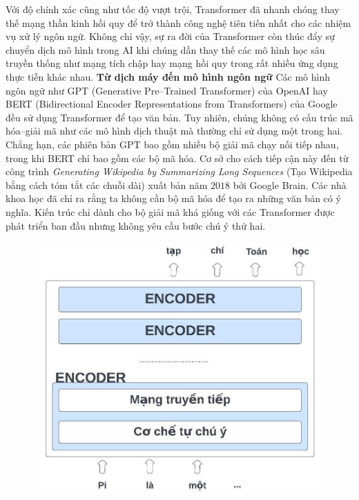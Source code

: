 \begin{multicols}{2}
	\vskip 0.1cm
	Với độ chính xác cũng như tốc độ vượt trội, Transformer đã nhanh chóng thay thế mạng thần kinh hồi quy để trở thành công nghệ tiên tiến nhất cho các nhiệm vụ xử lý ngôn ngữ. Không chỉ vậy, sự ra đời của Transformer còn thúc đẩy sự chuyển dịch mô hình trong AI khi chúng dần thay thế các mô hình học sâu truyền thống như mạng tích chập hay mạng hồi quy trong rất nhiều ứng dụng thực tiễn khác nhau.
	\vskip 0.1cm
	\textbf{\color{timhieukhoahoc}Từ dịch máy đến mô hình ngôn ngữ}
	\vskip 0.1cm
	Các mô hình ngôn ngữ như GPT (Generative Pre--Trained Transformer) của OpenAI hay BERT (Bidirectional Encoder Representations from Transformers) của Google đều sử dụng Transformer để tạo văn bản. Tuy nhiên, chúng không có cấu trúc mã hóa--giải mã như các mô hình dịch thuật mà thường chỉ sử dụng một trong hai. Chẳng hạn, các phiên bản GPT bao gồm nhiều bộ giải mã chạy nối tiếp nhau, trong khi BERT chỉ bao gồm các bộ mã hóa.
	\vskip 0.1cm
	Cơ sở cho cách tiếp cận này đến từ công trình \textit{Generating Wikipedia by Summarizing Long Sequences} (Tạo Wikipedia bằng cách tóm tắt các chuỗi dài) xuất bản năm $2018$ bởi Google Brain. Các nhà khoa học đã chỉ ra rằng ta không cần bộ mã hóa để tạo ra những văn bản có ý nghĩa. Kiến trúc chỉ dành cho bộ giải mã khá giống với các Transformer được phát triển ban đầu nhưng không yêu cầu bước chú ý thứ hai. 
	\begin{figure}[H]
		\vspace*{5pt}
		\centering
		\captionsetup{labelformat= empty, justification=centering}
		\includegraphics[width= 1\linewidth]{Decoder-Only.jpeg}

\end{figure}
\end{multicols}
